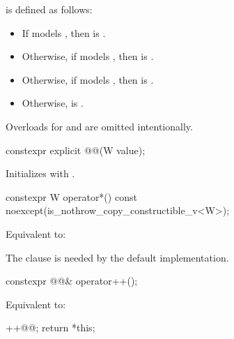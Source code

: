 \pnum
{} is defined as follows:
\begin{itemize}
\item If  models , then
 is .
\item Otherwise, if  models , then
 is .
\item Otherwise, if  models , then
 is .
\item Otherwise,  is .
\end{itemize}

\pnum
\begin{note}
Overloads for  and  are omitted intentionally.
\end{note}

\begin{itemdecl}
constexpr explicit @@(W value);
\end{itemdecl}

\begin{itemdescr}
\pnum
\effects
Initializes  with .
\end{itemdescr}

\begin{itemdecl}
constexpr W operator*() const noexcept(is_nothrow_copy_constructible_v<W>);
\end{itemdecl}

\begin{itemdescr}
\pnum
\effects
Equivalent to: 

\pnum
\begin{note}
The  clause is needed by the default 
implementation.
\end{note}
\end{itemdescr}

\begin{itemdecl}
constexpr @@& operator++();
\end{itemdecl}

\begin{itemdescr}
\pnum
\effects
Equivalent to:
\begin{codeblock}
++@@;
return *this;
\end{codeblock}
\end{itemdescr}

